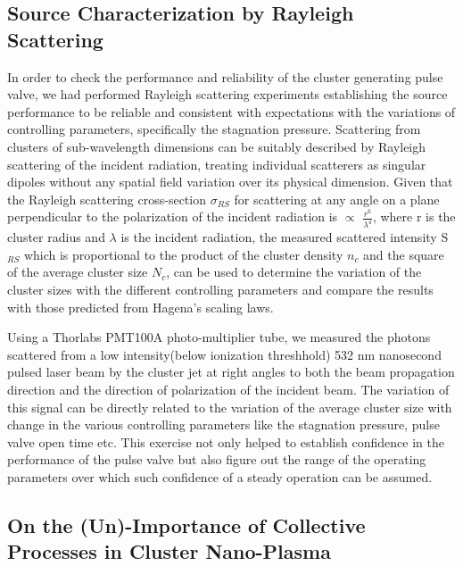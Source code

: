 \documentclass[a4paper,12pt]{article}
\begin{document}
\subsection{Source Characterization by Rayleigh Scattering}
In order to check the performance and reliability of the cluster generating pulse valve, we had performed Rayleigh scattering experiments establishing the source performance to be reliable and consistent with expectations with the variations of controlling parameters, specifically the stagnation pressure. 
Scattering from clusters of sub-wavelength dimensions can be suitably described by Rayleigh scattering of the incident radiation, treating individual scatterers as singular dipoles without any spatial field variation over its physical dimension. Given that the Rayleigh scattering cross-section $\sigma_{RS}$ for scattering at any angle on a plane perpendicular to the polarization of the incident radiation is $\propto$ \(\frac{r^6}{\lambda^4}\), where r is the cluster radius and $\lambda$ is the incident radiation, the measured scattered intensity S$_{RS}$ which is proportional to the product of the cluster density $n_{c}$ and the square of the average cluster size $N_{c}$, can be used to determine the variation of the cluster sizes with the different controlling parameters and compare the results with those predicted from Hagena's scaling laws. 

Using a Thorlabs PMT100A photo-multiplier tube, we measured the photons scattered from a low intensity(below ionization threshhold) 532 nm nanosecond pulsed laser beam by the cluster jet at right angles to both the beam propagation direction and the direction of polarization of the incident beam. The variation of this signal can be directly related to the variation of the average cluster size with change in the various controlling parameters like the stagnation pressure, pulse valve open time etc. This exercise not only helped to establish confidence in the performance of the pulse valve but also figure out the range of the operating parameters over which such confidence of a steady operation can be assumed. 

\subsection{On the (Un)-Importance of Collective Processes in Cluster Nano-Plasma}
\end{document}
